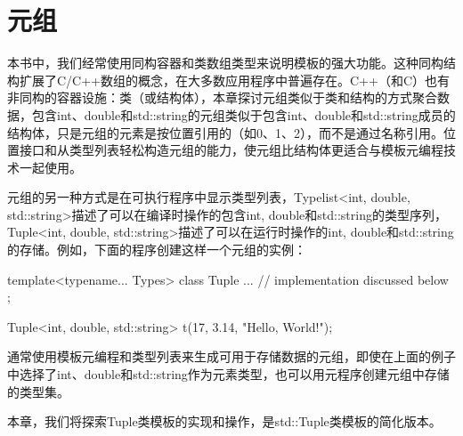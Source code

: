\chapter{元组}
本书中，我们经常使用同构容器和类数组类型来说明模板的强大功能。这种同构结构扩展了C/C++数组的概念，在大多数应用程序中普遍存在。C++（和C）也有非同构的容器设施：类（或结构体），本章探讨元组类似于类和结构的方式聚合数据，包含int、double和std::string的元组类似于包含int、double和std::string成员的结构体，只是元组的元素是按位置引用的（如0、1、2），而不是通过名称引用。位置接口和从类型列表轻松构造元组的能力，使元组比结构体更适合与模板元编程技术一起使用。

元组的另一种方式是在可执行程序中显示类型列表，Typelist<int, double, std::string>描述了可以在编译时操作的包含int, double和std::string的类型序列，Tuple<int, double, std::string>描述了可以在运行时操作的int, double和std::string的存储。例如，下面的程序创建这样一个元组的实例：

\begin{cpp}
template<typename... Types>
class Tuple {
	... // implementation discussed below
};

Tuple<int, double, std::string> t(17, 3.14, "Hello, World!");
\end{cpp}

通常使用模板元编程和类型列表来生成可用于存储数据的元组，即使在上面的例子中选择了int、double和std::string作为元素类型，也可以用元程序创建元组中存储的类型集。

本章，我们将探索Tuple类模板的实现和操作，是std::Tuple类模板的简化版本。





































